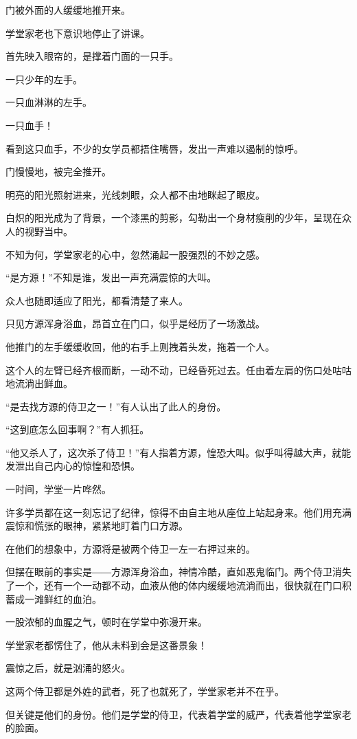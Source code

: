\begin{this_body}
门被外面的人缓缓地推开来。

学堂家老也下意识地停止了讲课。

首先映入眼帘的，是撑着门面的一只手。

一只少年的左手。

一只血淋淋的左手。

一只血手！

看到这只血手，不少的女学员都捂住嘴唇，发出一声难以遏制的惊呼。

门慢慢地，被完全推开。

明亮的阳光照射进来，光线刺眼，众人都不由地眯起了眼皮。

白炽的阳光成为了背景，一个漆黑的剪影，勾勒出一个身材瘦削的少年，呈现在众人的视野当中。

不知为何，学堂家老的心中，忽然涌起一股强烈的不妙之感。

“是方源！”不知是谁，发出一声充满震惊的大叫。

众人也随即适应了阳光，都看清楚了来人。

只见方源浑身浴血，昂首立在门口，似乎是经历了一场激战。

他推门的左手缓缓收回，他的右手上则拽着头发，拖着一个人。

这个人的左臂已经齐根而断，一动不动，已经昏死过去。任由着左肩的伤口处咕咕地流淌出鲜血。

“是去找方源的侍卫之一！”有人认出了此人的身份。

“这到底怎么回事啊？”有人抓狂。

“他又杀人了，这次杀了侍卫！”有人指着方源，惶恐大叫。似乎叫得越大声，就能发泄出自己内心的惊惶和恐惧。

一时间，学堂一片哗然。

许多学员都在这一刻忘记了纪律，惊得不由自主地从座位上站起身来。他们用充满震惊和慌张的眼神，紧紧地盯着门口方源。

在他们的想象中，方源将是被两个侍卫一左一右押过来的。

但摆在眼前的事实是――方源浑身浴血，神情冷酷，直如恶鬼临门。两个侍卫消失了一个，还有一个一动都不动，血液从他的体内缓缓地流淌而出，很快就在门口积蓄成一滩鲜红的血泊。

一股浓郁的血腥之气，顿时在学堂中弥漫开来。

学堂家老都愣住了，他从未料到会是这番景象！

震惊之后，就是汹涌的怒火。

这两个侍卫都是外姓的武者，死了也就死了，学堂家老并不在乎。

但关键是他们的身份。他们是学堂的侍卫，代表着学堂的威严，代表着他学堂家老的脸面。


\end{this_body}
